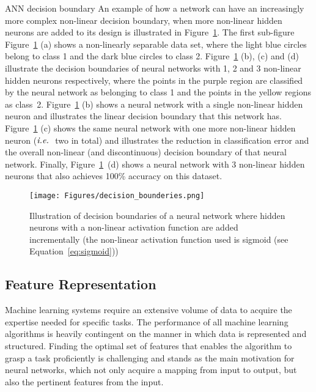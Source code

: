 \begin{Example}{ANN decision boundary}{}
An example of how a network can have an increasingly more complex non-linear decision boundary, when more non-linear hidden neurons are added to its design is illustrated in Figure~\ref{Fig:decision}. The first sub-figure Figure~\ref{Fig:decision} (a) shows a non-linearly separable data set, where the light blue circles belong to class 1 and the dark blue circles to class 2. Figure~\ref{Fig:decision} (b), (c) and (d) illustrate the decision boundaries of neural networks with 1, 2 and 3 non-linear hidden neurons respectively, where the points in the purple region are classified by the neural network as belonging to class 1 and the points in the yellow regions as class~2. 
Figure~\ref{Fig:decision} (b) shows a neural network with a single non-linear hidden neuron and illustrates the linear decision boundary that this network has. Figure~\ref{Fig:decision} (c) shows the same neural network with one more non-linear hidden neuron ($\textit{i.e.}\ $ two in total) and illustrates the reduction in classification error and the overall non-linear (and discontinuous) decision boundary of that neural network. Finally, Figure~\ref{Fig:decision}~(d) shows a neural network with 3 non-linear hidden neurons that also achieves 100\% accuracy on this dataset.


\begin{figure}[H]
	\begin{center}
		\texttt{[image: Figures/decision\_bounderies.png]}
	\end{center}
	\caption{Illustration of decision boundaries of a neural network where hidden neurons with a non-linear activation function are added incrementally (the non-linear activation function used is sigmoid (see Equation~\ref{eq:sigmoid}))}
	\label{Fig:decision}
\end{figure} 

\end{Example}

\subsection{Feature Representation}
Machine learning systems require an extensive volume of data to acquire the expertise needed for specific tasks. The performance of all machine learning algorithms is heavily contingent on the manner in which data is represented and structured. Finding the optimal set of features that enables the algorithm to grasp a task proficiently is challenging and stands as the main motivation for neural networks, which not only acquire a mapping from input to output, but also the pertinent features from the input.

